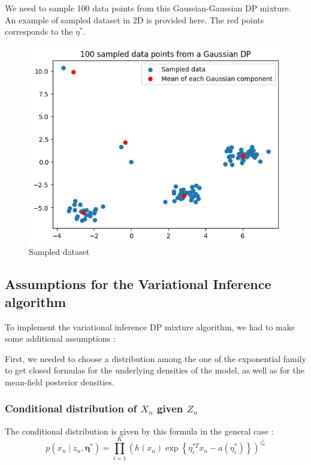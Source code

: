 \documentclass{article}
\begin{document}
We need to sample 100 data points from this Gaussian-Gaussian DP mixture. \\
An example of sampled dataset in 2D is provided here. The red points corresponds to the $\eta^*$.

\begin{figure}[H]
    \centering
    \includegraphics[scale=0.5]{images/sampled_dataset.png}
    \caption{Sampled dataset}
    \label{fig:data_sampl}
\end{figure}

\subsection{Assumptions for the Variational Inference algorithm}
To implement the variational inference DP mixture algorithm, we had to make some additional assumptions :

First, we needed to choose a distribution among the one of the exponential family to get closed formulas for the underlying densities of the model, as well as for the mean-field posterior densities.

\subsubsection{Conditional distribution of $X_n$ given $Z_n$}\label{sec:cdx}
The conditional distribution is given by this formula in the general case :
$$p\left(x_n \mid z_n, \boldsymbol{\eta}^*\right)=\prod_{i=1}^K\left(h\left(x_n\right) \exp \left\{\eta_i^{* T} x_n-a\left(\eta_i^*\right)\right\}\right)^{z_n^i}$$
\end{document}
